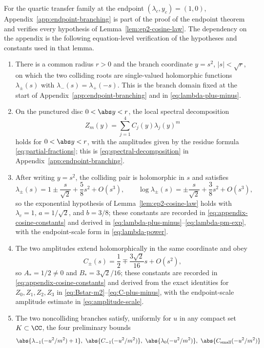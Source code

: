 \begin{proposition}\label{prop:endpoint-cosine-checklist}
For the quartic transfer family at the endpoint \((\lambda_c,y_c)=(1,0)\), Appendix~\ref{app:endpoint-branching} is part of the proof of the endpoint theorem and verifies every hypothesis of Lemma~\ref{lem:ep2-cosine-law}.  The dependency on the appendix is the following equation-level verification of the hypotheses and constants used in that lemma.
\begin{enumerate}
\item There is a common radius \(r>0\) and the branch coordinate \(y=s^2\), \(|s|<\sqrt r\), on which the two colliding roots are single-valued holomorphic functions \(\lambda_\pm(s)\) with \(\lambda_-(s)=\lambda_+(-s)\).  This is the branch domain fixed at the start of Appendix~\ref{app:endpoint-branching} and in \eqref{eq:lambda-plus-minus}.
\item On the punctured disc \(0<\abs y<r\), the local spectral decomposition
\[
Z_m(y)=\sum_{j=1}^4 C_j(y)\lambda_j(y)^m
\]
holds for \(0<\abs y<r\), with the amplitudes given by the residue formula \eqref{eq:partial-fractions}; this is \eqref{eq:spectral-decomposition} in Appendix~\ref{app:endpoint-branching}.
\item After writing \(y=s^2\), the colliding pair is holomorphic in \(s\) and satisfies
\[
\lambda_\pm(s)=1\pm \frac{s}{\sqrt2}+\frac58s^2+O(s^3),
\qquad
\log\lambda_\pm(s)=\pm\frac{s}{\sqrt2}+\frac38s^2+O(s^3),
\]
so the exponential hypothesis of Lemma~\ref{lem:ep2-cosine-law} holds with \(\lambda_c=1\), \(a=1/\sqrt2\), and \(b=3/8\); these constants are recorded in \eqref{eq:appendix-cosine-constants} and derived in \eqref{eq:lambda-plus-minus}--\eqref{eq:lambda-pm-exp}, with the endpoint-scale form in \eqref{eq:lambda-power}.
\item The two amplitudes extend holomorphically in the same coordinate and obey
\[
C_\pm(s)=\frac12\mp\frac{3\sqrt2}{16}s+O(s^2),
\]
so \(A_*=1/2\ne0\) and \(B_*=3\sqrt2/16\); these constants are recorded in \eqref{eq:appendix-cosine-constants} and derived from the exact identities for \(Z_0,Z_1,Z_2,Z_3\) in \eqref{eq:Bstar-m2}--\eqref{eq:C-plus-minus}, with the endpoint-scale amplitude estimate in \eqref{eq:amplitude-scale}.
\item The two noncolliding branches satisfy, uniformly for \(u\) in any compact set \(K\subset\CC\), the four preliminary bounds
\[
\abs{\lambda_{-1}(-u^2/m^2)+1},\
\abs{C_{-1}(-u^2/m^2)},\
\abs{\lambda_0(-u^2/m^2)},\
\abs{C_{\mathrm{small}}(-u^2/m^2)}
\]
\end{enumerate}
\end{proposition}
